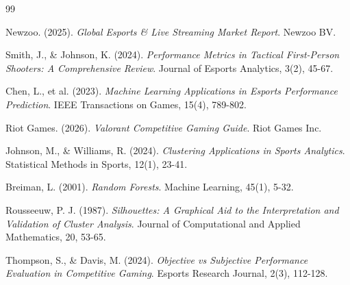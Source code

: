 \documentclass[11pt,a4paper]{article}
\begin{document}
\begin{thebibliography}{99}

 Newzoo. (2025). \textit{Global Esports \& Live Streaming Market Report}. Newzoo BV.

 Smith, J., \& Johnson, K. (2024). \textit{Performance Metrics in Tactical First-Person Shooters: A Comprehensive Review}. Journal of Esports Analytics, 3(2), 45-67.

 Chen, L., et al. (2023). \textit{Machine Learning Applications in Esports Performance Prediction}. IEEE Transactions on Games, 15(4), 789-802.

 Riot Games. (2026). \textit{Valorant Competitive Gaming Guide}. Riot Games Inc.

 Johnson, M., \& Williams, R. (2024). \textit{Clustering Applications in Sports Analytics}. Statistical Methods in Sports, 12(1), 23-41.

 Breiman, L. (2001). \textit{Random Forests}. Machine Learning, 45(1), 5-32.

 Rousseeuw, P. J. (1987). \textit{Silhouettes: A Graphical Aid to the Interpretation and Validation of Cluster Analysis}. Journal of Computational and Applied Mathematics, 20, 53-65.

 Thompson, S., \& Davis, M. (2024). \textit{Objective vs Subjective Performance Evaluation in Competitive Gaming}. Esports Research Journal, 2(3), 112-128.

\end{thebibliography}
\end{document}
